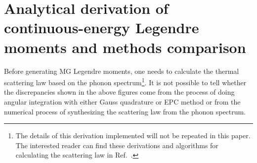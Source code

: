 \documentclass[review]{elsarticle}
\newcommand{\e}[1]{\ensuremath{\times10^{#1}}}
\newcommand{\tcr}[1]{\textcolor{blue}{\textbf{#1}}}
\begin{document}
%
%	
%
%
%		
%	
\section{Analytical derivation of continuous-energy Legendre moments and methods comparison}
Before generating MG Legendre moments, one needs to calculate the thermal scattering law based on the phonon spectrum\footnote{The details of this derivation implemented will not be repeated in this paper. The interested reader can find these derivations and algorithms for calculating the scattering law in Ref.~\cite{glasstone}.}. It is not possible to tell whether the discrepancies shown in the above figures come from the process of doing angular integration with either Gauss quadrature or EPC method or from the numerical process of synthesizing the scattering law from the phonon spectrum.
\end{document}
